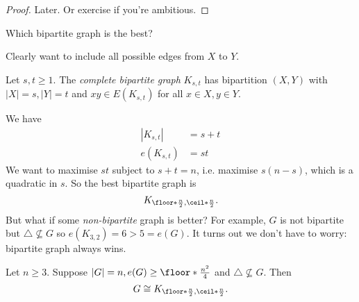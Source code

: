 \documentclass[a4paper]{article}
\begin{document}
\begin{proof}
  Later. Or exercise if you're ambitious.
\end{proof}

\begin{question}
  Which bipartite graph is the best?
\end{question}

Clearly want to include all possible edges from \(X\) to \(Y\).

\begin{definition}
  Let \(s,t\geq 1\). The \emph{complete bipartite graph} \(K_{s,t}\) has bipartition \((X,Y)\) with \(|X| = s, |Y| = t\) and \(xy \in E(K_{s,t})\) for all \(x\in X, y\in Y\).
\end{definition}

We have
\begin{align*}
  |K_{s,t}| &= s+t \\
  e(K_{s,t}) &= st
\end{align*}
We want to maximise \(st\) subject to \(s+t=n\), i.e. maximise \(s(n-s)\), which is a quadratic in \(s\). So the best bipartite graph is
\[
  K_{\floor*{\frac{n}{2}}, \ceil*{\frac{n}{2}}}.
\]
But what if some \emph{non-bipartite} graph is better? For example, \(G\) is not bipartite but \(\triangle \nsubseteq G\) so \(e(K_{3,2}) = 6 > 5 = e(G)\). It turns out we don't have to worry: bipartite graph always wins.

\begin{theorem}
  Let \(n\geq 3\). Suppose \(|G| = n, e(G) \geq \floor*{\frac{n^2}{4}}\) and \(\triangle \nsubseteq G\). Then
  \[
    G \cong K_{\floor*{\frac{n}{2}}, \ceil*{\frac{n}{2}}}.
  \]
\end{theorem}
\end{document}
